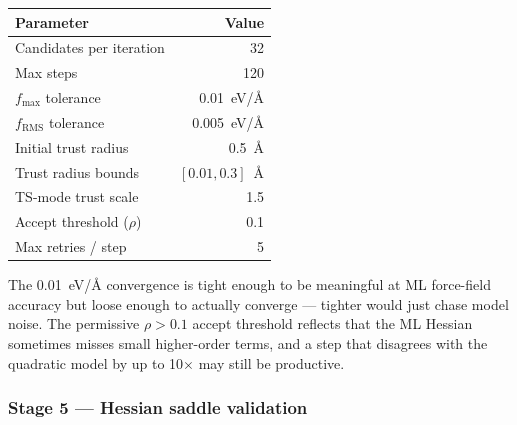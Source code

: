 \noindent\begin{tabular}{lr}
\toprule
Parameter & Value \\
\midrule
Candidates per iteration & 32 \\
Max steps & 120 \\
$f_\text{max}$ tolerance & \SI{0.01}{eV/\angstrom} \\
$f_\text{RMS}$ tolerance & \SI{0.005}{eV/\angstrom} \\
Initial trust radius & \SI{0.5}{\angstrom} \\
Trust radius bounds & $[0.01, 0.3]$~\AA \\
TS-mode trust scale & 1.5 \\
Accept threshold ($\rho$) & 0.1 \\
Max retries / step & 5 \\
\bottomrule
\end{tabular}

The \SI{0.01}{eV/\angstrom} convergence is tight enough to be meaningful at ML force-field accuracy but loose enough to actually converge --- tighter would just chase model noise. The permissive $\rho > 0.1$ accept threshold reflects that the ML Hessian sometimes misses small higher-order terms, and a step that disagrees with the quadratic model by up to 10$\times$ may still be productive.


\subsubsection{Stage 5 --- Hessian saddle validation}
\label{sec:pes-saddle-validation}

